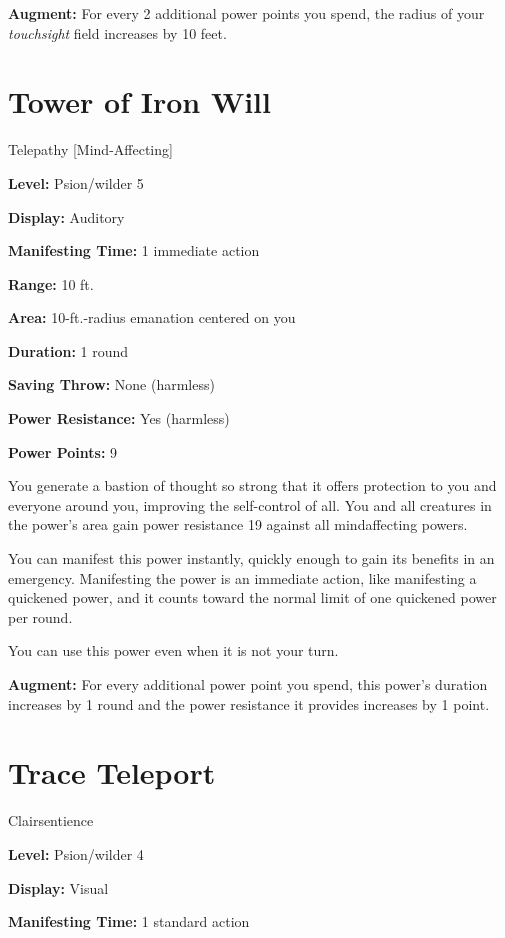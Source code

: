\documentclass{article}
\begin{document}
\textbf{Augment:} For every 2 additional power points you spend, the radius of 
your \textit{touchsight }field increases by 10 feet.

\vspace{12pt}
\section*{Tower of Iron Will}

Telepathy [Mind-Affecting]

\textbf{Level:} Psion/wilder 5

\textbf{Display:} Auditory

\textbf{Manifesting Time:} 1 immediate action

\textbf{Range:} 10 ft.

\textbf{Area:} 10-ft.-radius emanation centered on you

\textbf{Duration:} 1 round

\textbf{Saving Throw:} None (harmless)

\textbf{Power Resistance:} Yes (harmless)

\textbf{Power Points:} 9

You generate a bastion of thought so strong that it offers protection to you and 
everyone around you, improving the self-control of all. You and all creatures in 
the power's area gain power resistance 19 against all mindaffecting powers.

You can manifest this power instantly, quickly enough to gain its benefits in an 
emergency. Manifesting the power is an immediate action, like manifesting a quickened 
power, and it counts toward the normal limit of one quickened power per round.

You can use this power even when it is not your turn.

\textbf{Augment:} For every additional power point you spend, this power's duration 
increases by 1 round and the power resistance it provides increases by 1 point.

\vspace{12pt}
\section*{Trace Teleport}

Clairsentience

\textbf{Level:} Psion/wilder 4

\textbf{Display:} Visual

\textbf{Manifesting Time:} 1 standard action
\end{document}
